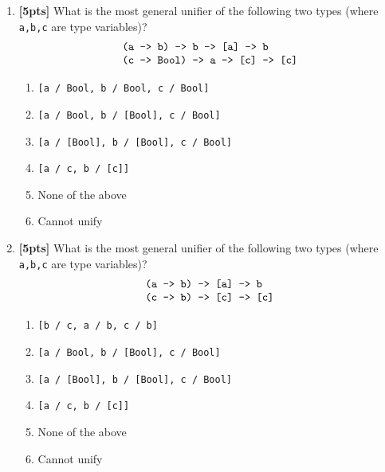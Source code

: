 \documentclass[paper=letter, fontsize=13pt]{article} %
\numberwithin{equation}{section} %
\newif\ifshowanswers\showanswerstrue
\begin{document}
\begin{enumerate}
\begin{enumerate}[label=(\Alph*)]
\ifshowanswers
\item App-R
\item App-L
\item App
\item \verb|(\y -> 2 + y) 6|
\item App
\item \verb|(\y -> 2 + y) 6|
\item Add
\else
\item \bigskip \bigskip
\item \bigskip \bigskip 
\item \bigskip \bigskip 
\item \bigskip \bigskip 
\item \bigskip \bigskip 
\item \bigskip \bigskip 
\item \bigskip \bigskip 
\fi
\end{enumerate}

\newpage
\item \textbf{[5pts]} What is the most general unifier of the following two 
types (where \texttt{a,b,c} are type variables)?
  \[
\begin{array}{l}
  \verb|(a -> b) -> b -> [a] -> b| \\
  \verb|(c -> Bool) -> a -> [c] -> [c]| \\
\end{array}
\]
\begin{enumerate}
\item \verb|[a / Bool, b / Bool, c / Bool]|
\item \verb|[a / Bool, b / [Bool], c / Bool]|
\item \verb|[a / [Bool], b / [Bool], c / Bool]|
\item \verb|[a / c, b / [c]]|
\item None of the above
\item Cannot unify
\end{enumerate}
  \bigskip
  \bigskip
  \bigskip

\item \textbf{[5pts]} What is the most general unifier of the following two types (where \texttt{a,b,c} are type variables)?
  \[
\begin{array}{l}
  \verb|(a -> b) -> [a] -> b| \\
  \verb|(c -> b) -> [c] -> [c]| 
\end{array}
\]
\begin{enumerate}
\item \verb|[b / c, a / b, c / b]|
\item \verb|[a / Bool, b / [Bool], c / Bool]|
\item \verb|[a / [Bool], b / [Bool], c / Bool]|
\item \verb|[a / c, b / [c]]|
\item None of the above
\item Cannot unify
\end{enumerate}
  \bigskip
  \bigskip
  \bigskip


\end{enumerate}
\end{document}
